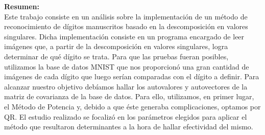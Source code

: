 \documentclass[10pt, a4paper]{article}
\begin{document}
\LARGE{\textbf{Resumen:}}\\
\large{Este trabajo consiste en un análisis sobre la implementación de un método de reconocimiento de dígitos manuscritos basado en la descomposición en valores singulares. Dicha implementación consiste en un programa encargado de leer imágenes que, a partir de la descomposición en valores singulares, logra determinar de qué dígito se trata. Para que las pruebas fueran posibles, utilizamos la base de datos MNIST que nos proporcionó una gran cantidad de imágenes de cada dígito que luego serían comparadas con el dígito a definir. Para alcanzar nuestro objetivo debíamos hallar los autovalores y autovectores de la matriz de covarianza de la base de datos. Para ello, utilizamos, en primer lugar, el Método de Potencia y, debido a que éste generaba complicaciones, optamos por QR. El estudio realizado se focalizó en los parámetros elegidos para aplicar el método que resultaron determinantes a la hora de hallar efectividad del mismo.}
\newline
 
\newpage
\thispagestyle{empty}

\tableofcontents

\newpage
\end{document}
